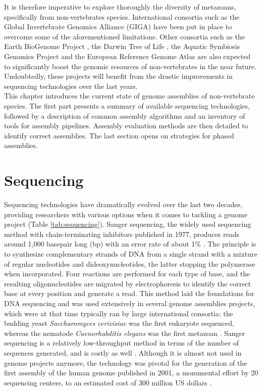 It is therefore imperative to explore thoroughly the diversity of metazoans, specifically from non-vertebrates species. International consortia such as the Global Invertebrate Genomics Alliance (GIGA) \cite{giga2014, giga2017} have been put in place to overcome some of the aforementioned limitations. Other consortia such as  the Earth BioGenome Project \cite{biogenome}, the Darwin Tree of Life \cite{dtol}, the Aquatic Symbiosis Genomics Project \cite{aquatic_symbiosis} and the European Reference Genome Atlas \cite{erga} are also expected to significantly boost the genomic resources of non-vertebrates in the near future. Undoubtedly, these projects will benefit from the drastic improvements in sequencing technologies over the last years.\\

This chapter introduces the current state of genome assemblies of non-vertebrate species. The first part presents a summary of available sequencing technologies, followed by a description of common assembly algorithms and an inventory of tools for assembly pipelines. Assembly evaluation methods are then detailed to identify correct assemblies. The last section opens on strategies for phased assemblies. \\

\section{Sequencing}

Sequencing technologies have dramatically evolved over the last two decades, providing researchers with various options when it comes to tackling a genome project (Table \ref{tab:sequencing}). Sanger sequencing, the widely used sequencing method with chain-terminating inhibitors published in 1977, produces reads around 1,000 basepair long (bp) with an error rate of about 1\% \cite{Sanger1977}. The principle is to synthesize complementary strands of DNA from a single strand with a mixture of regular nucleotides and dideoxynucleotides, the latter stopping the polymerase when incorporated. Four reactions are performed for each type of base, and the resulting oligonucleotides are migrated by electrophoresis to identify the correct base at every position and generate a read. This method laid the foundations for DNA sequencing and was used extensively in several genome assemblies projects, which were at that time typically ran by large international consortia: the budding yeast \textit{Saccharomyces cerivisiae} \cite{saccharomyces_cerevisiae} was the first eukaryote sequenced, whereas the nematode \textit{Caenorhabditis elegans} was the first metazoan \cite{caenorhabditis_elegans2}. Sanger sequencing is a relatively low-throughput method in terms of the number of sequences generated, and is costly as well \cite{Wajid2016}. Although it is almost not used in genome projects anymore, the technology was pivotal for the generation of the first assembly of the human genome published in 2001, a monumental effort by 20 sequencing centers, to an estimated cost of 300 million US dollars \cite{firsthumangenome}. \\

